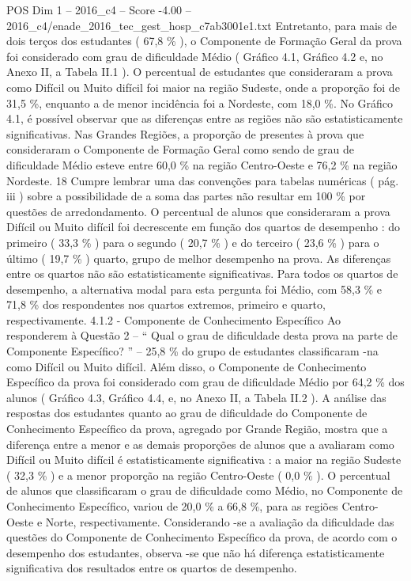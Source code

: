\begin{textsample}{POS Dim 1 – 2016\_c4 – Score -4.00 – 2016\_c4/enade\_2016\_tec\_gest\_hosp\_c7ab3001e1.txt}
Entretanto, para mais de dois terços dos estudantes ( 67,8 \% ), o Componente de Formação Geral da prova foi considerado com grau de dificuldade Médio ( Gráfico 4.1, Gráfico 4.2 e, no Anexo II, a Tabela II.1 ).
O percentual de estudantes que consideraram a prova como Difícil ou Muito difícil foi maior na região Sudeste, onde a proporção foi de 31,5 \%, enquanto a de menor incidência foi a Nordeste, com 18,0 \%.
No Gráfico 4.1, é possível observar que as diferenças entre as regiões não são estatisticamente significativas.
Nas Grandes Regiões, a proporção de presentes à prova que consideraram o Componente de Formação Geral como sendo de grau de dificuldade Médio esteve entre 60,0 \% na região Centro-Oeste e 76,2 \% na região Nordeste. 18 Cumpre lembrar uma das convenções para tabelas numéricas ( pág. iii ) sobre a possibilidade de a soma das partes não resultar em 100 \% por questões de arredondamento.
O percentual de alunos que consideraram a prova Difícil ou Muito difícil foi decrescente em função dos quartos de desempenho : do primeiro ( 33,3 \% ) para o segundo ( 20,7 \% ) e do terceiro ( 23,6 \% ) para o último ( 19,7 \% ) quarto, grupo de melhor desempenho na prova.
As diferenças entre os quartos não são estatisticamente significativas.
Para todos os quartos de desempenho, a alternativa modal para esta pergunta foi Médio, com 58,3 \% e 71,8 \% dos respondentes nos quartos extremos, primeiro e quarto, respectivamente. 4.1.2 - Componente de Conhecimento Específico Ao responderem à Questão 2 – “ Qual o grau de dificuldade desta prova na parte de Componente Específico? ” – 25,8 \% do grupo de estudantes classificaram -na como Difícil ou Muito difícil.
Além disso, o Componente de Conhecimento Específico da prova foi considerado com grau de dificuldade Médio por 64,2 \% dos alunos ( Gráfico 4.3, Gráfico 4.4, e, no Anexo II, a Tabela II.2 ).
A análise das respostas dos estudantes quanto ao grau de dificuldade do Componente de Conhecimento Específico da prova, agregado por Grande Região, mostra que a diferença entre a menor e as demais proporções de alunos que a avaliaram como Difícil ou Muito difícil é estatisticamente significativa : a maior na região Sudeste ( 32,3 \% ) e a menor proporção na região Centro-Oeste ( 0,0 \% ).
O percentual de alunos que classificaram o grau de dificuldade como Médio, no Componente de Conhecimento Específico, variou de 20,0 \% a 66,8 \%, para as regiões Centro-Oeste e Norte, respectivamente.
Considerando -se a avaliação da dificuldade das questões do Componente de Conhecimento Específico da prova, de acordo com o desempenho dos estudantes, observa -se que não há diferença estatisticamente significativa dos resultados entre os quartos de desempenho.

\end{textsample}
